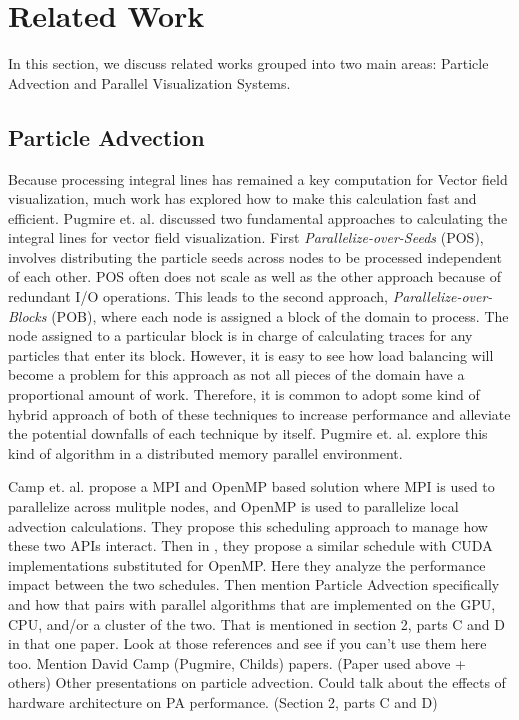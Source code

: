 \documentclass{IEEEtran}
\begin{document}
\section{Related Work}
In this section, we discuss related works grouped into two main areas: Particle Advection and Parallel Visualization Systems.

\subsection{Particle Advection}
Because processing integral lines has remained a key computation for Vector field visualization\cite{McLoughlin}, much work has explored how to make this calculation fast and efficient.
%
Pugmire et. al. discussed two fundamental approaches to calculating the integral lines for vector field visualization.\cite{Pugmire:SC09}
%
First \textit{Parallelize-over-Seeds} (POS), involves distributing the particle seeds across nodes to be processed independent of each other.
%
POS often does not scale as well as the other approach because of redundant I/O operations.
%
This leads to the second approach, \textit{Parallelize-over-Blocks} (POB), where each node is assigned a block of the domain to process.
%
The node assigned to a particular block is in charge of calculating traces for any particles that enter its block.
%
However, it is easy to see how load balancing will become a problem for this approach as not all pieces of the domain have a proportional amount of work.
%
Therefore, it is common to adopt some kind of hybrid approach of both of these techniques to increase performance and alleviate the potential downfalls of each technique by itself.
%
Pugmire et. al. \cite{Pugmire12} explore this kind of algorithm in a distributed memory parallel environment.

Camp et. al. \cite{Camp11} propose a MPI and OpenMP based solution where MPI is used to parallelize across mulitple nodes, and OpenMP is used to parallelize local advection calculations.
%
They propose this scheduling approach to manage how these two APIs interact.
%
Then in \cite{Camp13}, they propose a similar schedule with CUDA implementations substituted for OpenMP.
%
Here they analyze the performance impact between the two schedules.
%
Then mention Particle Advection specifically and how that pairs with parallel algorithms that are implemented on the GPU, CPU, and/or a cluster of the two.
%
That is mentioned in section 2, parts C and D in that one paper.
%
Look at those references and see if you can't use them here too.
%
Mention David Camp (Pugmire, Childs) papers. (Paper used above + others)
%
Other presentations on particle advection.
%
Could talk about the effects of hardware architecture on PA performance. (Section 2, parts C and D)
\end{document}
